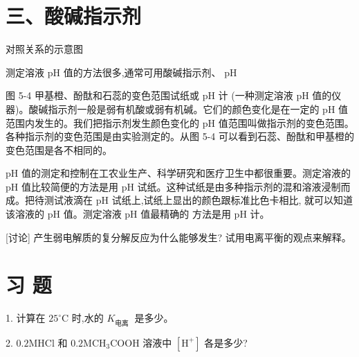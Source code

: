 \documentclass[10pt]{article}
\begin{document}
\section*{三、酸碱指示剂}

对照关系的示意图

测定溶液 \(\mathrm{{pH}}\) 值的方法很多,通常可用酸碱指示剂、 \(\mathrm{{pH}}\)

\begin{center}
\end{center}

图 5-4 甲基橙、酚酞和石蕊的变色范围试纸或 \(\mathrm{{pH}}\) 计 (一种测定溶液 \(\mathrm{{pH}}\) 值的仪器)。酸碱指示剂一般是弱有机酸或弱有机碱。它们的颜色变化是在一定的 \(\mathrm{{pH}}\) 值范围内发生的。我们把指示剂发生颜色变化的 \(\mathrm{{pH}}\) 值范围叫做指示剂的变色范围。各种指示剂的变色范围是由实验测定的。从图 5-4 可以看到石蕊、酚酞和甲基橙的变色范围是各不相同的。

\(\mathrm{{pH}}\) 值的测定和控制在工农业生产、科学研究和医疗卫生中都很重要。测定溶液的 \(\mathrm{{pH}}\) 值比较简便的方法是用 \(\mathrm{{pH}}\) 试纸。这种试纸是由多种指示剂的混和溶液浸制而成。把待测试液滴在 \(\mathrm{{pH}}\) 试纸上,试纸上显出的颜色跟标准比色卡相比, 就可以知道该溶液的 \(\mathrm{{pH}}\) 值。测定溶液 \(\mathrm{{pH}}\) 值最精确的 方法是用 \(\mathrm{{pH}}\) 计。

[讨论] 产生弱电解质的复分解反应为什么能够发生? 试用电离平衡的观点来解释。

\section*{习 题}

1. 计算在 \({25}^{ \circ }\mathrm{C}\) 时,水的 \({K}_{\text{电离 }}\) 是多少。

2. \({0.2}\mathrm{{MHCl}}\) 和 \({0.2}{\mathrm{{MCH}}}_{3}\mathrm{{COOH}}\) 溶液中 \(\left\lbrack {\mathrm{H}}^{ + }\right\rbrack\) 各是多少?
\end{document}
